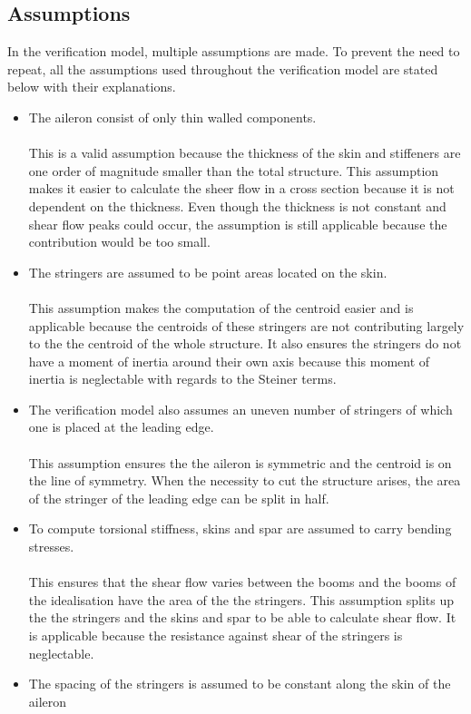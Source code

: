 \subsection{Assumptions}
In the verification model, multiple assumptions are made. To prevent the need to repeat, all the assumptions used throughout the verification model are stated below with their explanations.\\
\begin{itemize}
    \item The aileron consist of only thin walled components.\\\\
    This is a valid assumption because the thickness of the skin and stiffeners are one order of magnitude smaller than the total structure. This assumption makes it easier to calculate the sheer flow in a cross section because it is not dependent on the thickness. Even though the thickness is not constant and shear flow peaks could occur, the assumption is still applicable because the contribution would be too small.\\
    \item The stringers are assumed to be point areas located on the skin.\\ \\
    This assumption makes the computation of the centroid easier and is applicable because the centroids of these stringers are not contributing largely to the the centroid of the whole structure. It also ensures the stringers do not have a moment of inertia around their own axis because this moment of inertia is neglectable with regards to the Steiner terms.\\
    \item The verification model also assumes an uneven number of stringers of which one is placed at the leading edge.\\\\
    This assumption ensures the the aileron is symmetric and the centroid is on the line of symmetry. When the necessity to cut the structure arises, the area of the stringer of the leading edge can be split in half.\\
    \item To compute torsional stiffness, skins and spar are assumed to carry bending stresses.\\ \\ This ensures that the shear flow varies between the booms and the booms of the idealisation have the area of the the stringers. This assumption splits up the the stringers and the skins and spar to be able to calculate shear flow. It is applicable because the resistance against shear of the stringers is neglectable. \\
    \item The spacing of the stringers is assumed to be constant along the skin of the aileron
    
\end{itemize}
